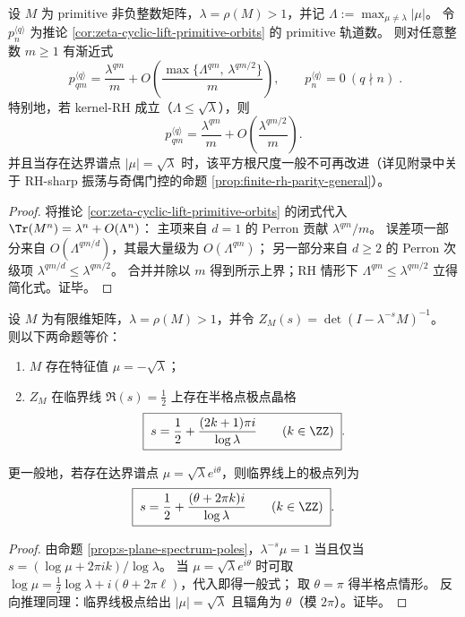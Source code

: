 \begin{proposition}\label{prop:zeta-cyclic-lift-prime-shadow-asymptotic}
设 \(M\) 为 primitive 非负整数矩阵，\(\lambda=\rho(M)>1\)，并记
\(
\Lambda:=\max_{\mu\neq\lambda}|\mu|
\)。
令 \(p_n^{\langle q\rangle}\) 为推论 \ref{cor:zeta-cyclic-lift-primitive-orbits} 的 primitive 轨道数。
则对任意整数 \(m\ge 1\) 有渐近式
\[
\boxed{\;
p_{qm}^{\langle q\rangle}
=\frac{\lambda^{qm}}{m}
+O\!\left(\frac{\max\{\Lambda^{qm},\,\lambda^{qm/2}\}}{m}\right),\qquad
p_n^{\langle q\rangle}=0\ (q\nmid n)\; }.
\]
特别地，若 kernel-RH 成立（\(\Lambda\le\sqrt{\lambda}\)），则
\[
\boxed{\;
p_{qm}^{\langle q\rangle}
=\frac{\lambda^{qm}}{m}
+O\!\left(\frac{\lambda^{qm/2}}{m}\right).\;}
\]
并且当存在达界谱点 \(|\mu|=\sqrt{\lambda}\) 时，该平方根尺度一般不可再改进（详见附录中关于 RH-sharp 振荡与奇偶门控的命题 \ref{prop:finite-rh-parity-general}）。
\end{proposition}
\begin{proof}
将推论 \ref{cor:zeta-cyclic-lift-primitive-orbits} 的闭式代入
\(
\Tr(M^n)=\lambda^n+O(\Lambda^n)
\)：
主项来自 \(d=1\) 的 Perron 贡献 \(\lambda^{qm}/m\)。
误差项一部分来自 \(O(\Lambda^{qm/d})\)，其最大量级为 \(O(\Lambda^{qm})\)；
另一部分来自 \(d\ge 2\) 的 Perron 次级项 \(\lambda^{qm/d}\le \lambda^{qm/2}\)。
合并并除以 \(m\) 得到所示上界；RH 情形下 \(\Lambda^{qm}\le \lambda^{qm/2}\) 立得简化式。证毕。
\end{proof}

\begin{corollary}[符号翻转模态与临界线半格点梳齿]\label{cor:zeta-signflip-half-lattice}
设 \(M\) 为有限维矩阵，\(\lambda=\rho(M)>1\)，并令 \(Z_M(s)=\det(I-\lambda^{-s}M)^{-1}\)。
则以下两命题等价：
\begin{enumerate}
  \item \(M\) 存在特征值 \(\mu=-\sqrt{\lambda}\)；
  \item \(Z_M\) 在临界线 \(\Re(s)=\tfrac12\) 上存在半格点极点晶格
  \[
  \boxed{\;
  s=\frac12+\frac{(2k+1)\pi i}{\log\lambda}\qquad(k\in\ZZ)\; }.
  \]
\end{enumerate}
更一般地，若存在达界谱点 \(\mu=\sqrt{\lambda}e^{i\theta}\)，则临界线上的极点列为
\[
\boxed{\;
s=\frac12+\frac{(\theta+2\pi k)i}{\log\lambda}\qquad(k\in\ZZ)\; }.
\]
\end{corollary}
\begin{proof}
由命题 \ref{prop:s-plane-spectrum-poles}，\(\lambda^{-s}\mu=1\) 当且仅当
\(
s=(\log\mu+2\pi i k)/\log\lambda
\)。
当 \(\mu=\sqrt{\lambda}e^{i\theta}\) 时可取 \(\log\mu=\tfrac12\log\lambda+i(\theta+2\pi\ell)\)，代入即得一般式；
取 \(\theta=\pi\) 得半格点情形。
反向推理同理：临界线极点给出 \(|\mu|=\sqrt{\lambda}\) 且辐角为 \(\theta\)（模 \(2\pi\)）。证毕。
\end{proof}

